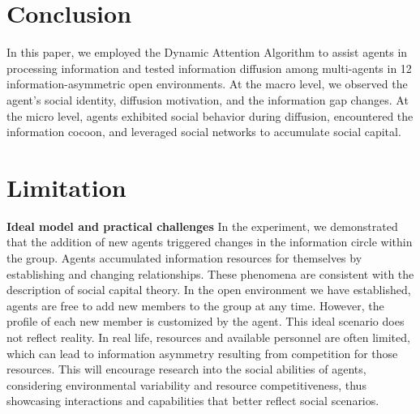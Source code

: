 \section{Conclusion}

In this paper, we employed the Dynamic Attention Algorithm to assist agents in processing information and tested information diffusion among multi-agents in 12 information-asymmetric open environments. At the macro level, we observed the agent's social identity, diffusion motivation, and the information gap changes. At the micro level, agents exhibited social behavior during diffusion, encountered the information cocoon, and leveraged social networks to accumulate social capital.





\section{Limitation}





\noindent \textbf{Ideal model and practical challenges} \quad In the experiment, we demonstrated that the addition of new agents triggered changes in the information circle within the group. 
Agents accumulated information resources for themselves by establishing and changing relationships. These phenomena are consistent with the description of social capital theory. 
In the open environment we have established, agents are free to add new members to the group at any time. However, the profile of each new member is customized by the agent. 
This ideal scenario does not reflect reality. In real life, resources and available personnel are often limited, which can lead to information asymmetry resulting from competition for those resources.
This will encourage research into the social abilities of agents, considering environmental variability and resource competitiveness, thus showcasing interactions and capabilities that better reflect social scenarios.